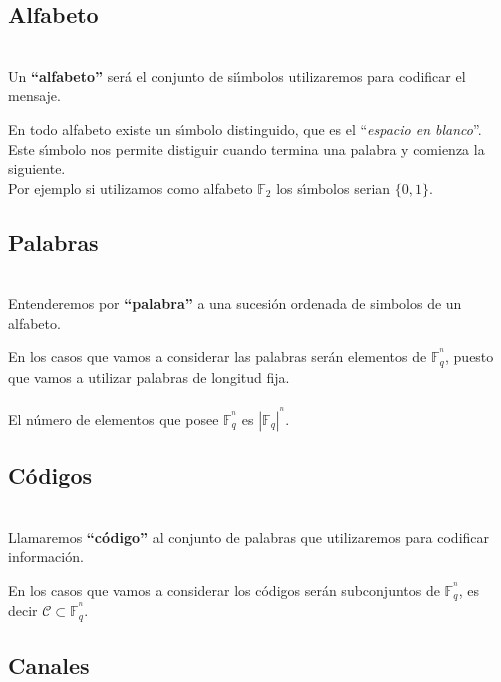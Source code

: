 \subsection{Alfabeto}

\begin{definicion}[Alfabeto]
\ \\
Un \textbf{``alfabeto''} ser\'a el conjunto de si\'{\i}mbolos utilizaremos
para codificar el mensaje.
\end{definicion}
En todo alfabeto existe un s\'{\i}mbolo distinguido, que es el ``\emph{espacio
en blanco}''. Este s\'{\i}mbolo nos permite distiguir cuando termina una palabra
y comienza la siguiente.\\

Por ejemplo si utilizamos como alfabeto $\mathbb{F}_2$ los s\'{\i}mbolos 
serian $\{0,1\}$.

\subsection{Palabras}

\begin{definicion}[Palabra]
\ \\
Entenderemos por \textbf{``palabra''} a una sucesi\'on ordenada de simbolos de
un alfabeto.
\end{definicion}
En los casos que vamos a considerar las palabras ser\'an elementos de
$\mathbb{F}^{^n}_q$, puesto que vamos a utilizar palabras de longitud fija.\\ \\
%
El n\'umero de elementos que posee $\mathbb{F}^{^n}_q$ es $|\mathbb{F}_q|^{^n}$.


\subsection{C\'odigos}

\begin{definicion}[C\'odigos]
\ \\
Llamaremos \textbf{``c\'odigo''} al conjunto de palabras que utilizaremos para
codificar informaci\'on.
\end{definicion}
En los casos que vamos a considerar los c\'odigos ser\'an subconjuntos de
$\mathbb{F}^{^n}_q$, es decir $\mathcal{C}\subset \mathbb{F}^{^n}_q$.

\subsection{Canales}

